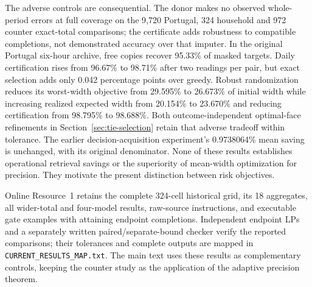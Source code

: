 The adverse controls are consequential. The donor makes no observed
whole-period errors at full coverage on the 9,720 Portugal, 324 household
and 972 counter exact-total comparisons; the certificate adds robustness
to compatible completions, not demonstrated accuracy over that imputer.
In the original Portugal six-hour archive, free copies recover 95.33\%
of masked targets. Daily certification rises from 96.67\% to 98.71\% after
two readings per pair, but exact selection adds only 0.042 percentage points
over greedy. Robust randomization reduces its worst-width objective from
29.595\% to 26.673\% of initial width while increasing realized expected
width from 20.154\% to 23.670\% and reducing certification from 98.795\%
to 98.688\%. Both outcome-independent optimal-face refinements in
Section~\ref{sec:tie-selection} retain that adverse tradeoff within tolerance.
The earlier decision-acquisition experiment's 0.9738064\% mean saving is
unchanged, with its original denominator. None of these results establishes
operational retrieval savings or the superiority of mean-width optimization
for precision. They motivate the present distinction between risk objectives.

Online Resource~1 retains the complete 324-cell historical grid, its 18
aggregates, all wider-total and four-model results, raw-source instructions,
and executable gate examples with attaining endpoint completions. Independent
endpoint LPs and a separately written paired/separate-bound checker verify
the reported comparisons; their tolerances and complete outputs are mapped
in \texttt{CURRENT\_RESULTS\_MAP.txt}. The main text uses these results as
complementary controls, keeping the counter study as the application of the
adaptive precision theorem.

